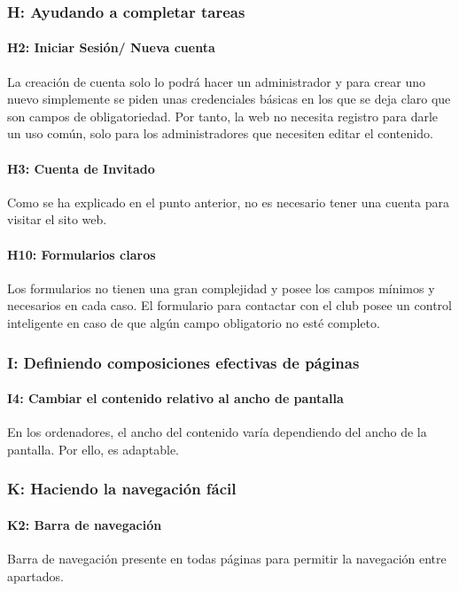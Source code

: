 \documentclass[10pt, spanish, pdftex]{template/UC3M_document}
\begin{document}
\subsubsection{H: Ayudando a completar tareas}
\paragraph{H2: Iniciar Sesión/ Nueva cuenta}
  La creación de cuenta solo lo podrá hacer un administrador y para crear uno nuevo simplemente se piden unas credenciales básicas en los que se deja claro que son campos de obligatoriedad.
  Por tanto, la web no necesita registro para darle un uso común, solo para los administradores que necesiten editar el contenido.
\paragraph{H3: Cuenta de Invitado}
  Como se ha explicado en el punto anterior, no es necesario tener una cuenta para visitar el sito web.
\paragraph{H10: Formularios claros}
  Los formularios no tienen una gran complejidad y posee los campos mínimos y necesarios en cada caso. El formulario para contactar con el club posee un control inteligente en caso de que algún campo obligatorio no esté completo.

\subsubsection{I: Definiendo composiciones efectivas de páginas}
\paragraph{I4: Cambiar el contenido relativo al ancho de pantalla}
  En los ordenadores, el ancho del contenido varía dependiendo del ancho de la pantalla. Por ello, es adaptable.

\subsubsection{K: Haciendo la navegación fácil}
\paragraph{K2: Barra de navegación}
  Barra de navegación presente en todas páginas para permitir la navegación entre apartados.
\end{document}
